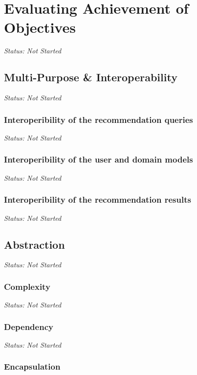 \chapter{Evaluating Achievement of Objectives}

\emph{Status: Not Started}

\section{Multi-Purpose \& Interoperability}

\emph{Status: Not Started}

\subsection{Interoperibility of the recommendation queries}

\emph{Status: Not Started}

\subsection{Interoperibility of the user and domain models}

\emph{Status: Not Started}

\subsection{Interoperibility of the recommendation results}

\emph{Status: Not Started}

\section{Abstraction}

\emph{Status: Not Started}

\subsection{Complexity}

\emph{Status: Not Started}

\subsection{Dependency}

\emph{Status: Not Started}

\subsection{Encapsulation}

